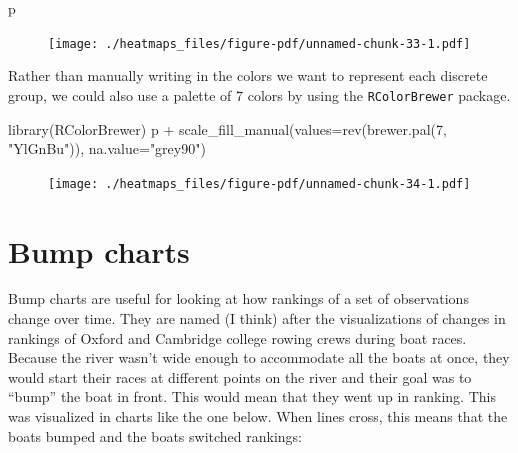 \documentclass[
  letterpaper,
  DIV=11,
  numbers=noendperiod]{scrreprt}
\newenvironment{Shaded}{\begin{snugshade}}{\end{snugshade}}
\newcommand{\AttributeTok}[1]{\textcolor[rgb]{0.40,0.45,0.13}{#1}}
\newcommand{\DecValTok}[1]{\textcolor[rgb]{0.68,0.00,0.00}{#1}}
\newcommand{\FunctionTok}[1]{\textcolor[rgb]{0.28,0.35,0.67}{#1}}
\newcommand{\NormalTok}[1]{\textcolor[rgb]{0.00,0.23,0.31}{#1}}
\newcommand{\SpecialCharTok}[1]{\textcolor[rgb]{0.37,0.37,0.37}{#1}}
\newcommand{\StringTok}[1]{\textcolor[rgb]{0.13,0.47,0.30}{#1}}
\begin{document}
\begin{Shaded}
\begin{Highlighting}[]
\NormalTok{p}
\end{Highlighting}
\end{Shaded}

\begin{figure}[H]

{\centering \texttt{[image: ./heatmaps\_files/figure-pdf/unnamed-chunk-33-1.pdf]}

}

\end{figure}

Rather than manually writing in the colors we want to represent each
discrete group, we could also use a palette of 7 colors by using the
\texttt{RColorBrewer} package.

\begin{Shaded}
\begin{Highlighting}[]
\FunctionTok{library}\NormalTok{(RColorBrewer)}
\NormalTok{p }\SpecialCharTok{+} \FunctionTok{scale\_fill\_manual}\NormalTok{(}\AttributeTok{values=}\FunctionTok{rev}\NormalTok{(}\FunctionTok{brewer.pal}\NormalTok{(}\DecValTok{7}\NormalTok{, }\StringTok{"YlGnBu"}\NormalTok{)), }\AttributeTok{na.value=}\StringTok{"grey90"}\NormalTok{)}
\end{Highlighting}
\end{Shaded}

\begin{figure}[H]

{\centering \texttt{[image: ./heatmaps\_files/figure-pdf/unnamed-chunk-34-1.pdf]}

}

\end{figure}


\hypertarget{bump-charts}{%
\chapter{Bump charts}\label{bump-charts}}

Bump charts are useful for looking at how rankings of a set of
observations change over time. They are named (I think) after the
visualizations of changes in rankings of Oxford and Cambridge college
rowing crews during boat races. Because the river wasn't wide enough to
accommodate all the boats at once, they would start their races at
different points on the river and their goal was to ``bump'' the boat in
front. This would mean that they went up in ranking. This was visualized
in charts like the one below. When lines cross, this means that the
boats bumped and the boats switched rankings:
\end{document}
